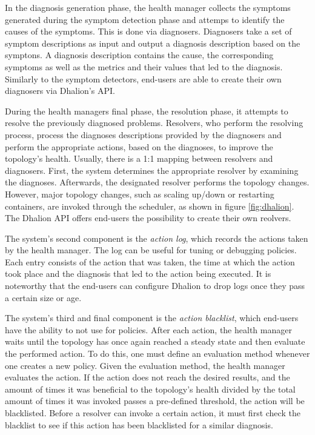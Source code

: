         \quad In the diagnosis generation phase, the health manager collects the symptoms generated during the symptom detection phase and attemps to identify the causes 
        of the symptoms. 
        This is done via diagnosers. Diagnosers take a set of symptom descriptions as input and output a diagnosis description based on the symptons. 
        A diagnosis description contains the cause, the corresponding symptoms as well as the metrics and their values that led to the diagnosis.
        Similarly to the symptom detectors, end-users are able to create their own diagnosers via Dhalion's API.

        \quad During the health managers final phase, the resolution phase, it attempts to resolve the previously diagnosed problems.
        Resolvers, who perform the resolving process, process the diagnoses descriptions provided by the diagnosers and perform the 
        appropriate actions, based on the diagnoses, to improve the topology's health. Usually, there is a 1:1 mapping between resolvers and diagnosers.
        First, the system determines the appropriate resolver by examining the diagnoses. Afterwards, the designated resolver performs the topology changes.
        However, major topology changes, such as scaling up/down or restarting containers, are invoked through the scheduler, as shown in figure \ref{fig:dhalion}.
        The Dhalion API offers end-users the possibility to create their own reolvers.

        \quad The system's second component is the \textit{action log}, which records the actions taken by the health manager.
        The log can be useful for tuning or debugging policies. Each entry consists of the action that was taken, the time at which the action took place and the diagnosis 
        that led to the action being executed. 
        It is noteworthy that the end-users can configure Dhalion to drop logs once they pass a certain size or age.

        \quad The system's third and final component is the \textit{action blacklist}, which end-users have the ability to not use for policies.
        After each action, the health manager waits until the topology has once again reached a steady state and then evaluate the performed action.
        To do this, one must define an evaluation method whenever one creates a new policy. Given the evaluation method, the health manager evaluates the action.
        If the action does not reach the desired results, and the amount of times it was beneficial to the topology's health divided by the total amount of times it 
        was invoked passes a pre-defined threshold, the action will be blacklisted.
        Before a resolver can invoke a certain action, it must first check the blacklist to see if this action has been blacklisted for a similar diagnosis.

